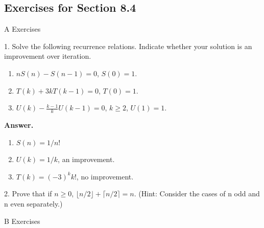 \documentclass[10pt,]{book}
\theoremstyle{plain}
\theoremstyle{definition}
\theoremstyle{definition}
\theoremstyle{definition}
\theoremstyle{definition}
\numberwithin{equation}{section}
\begin{document}
\subsection[Exercises for Section 8.4]{Exercises for Section 8.4}\label{exercises-8-4}
\hypertarget{exercisegroup-8}{}\typeout{************************************************}
\typeout{************************************************}
A Exercises%
\begin{exercisegroup}
\item[1.]\hypertarget{exercise-29}{}Solve the following recurrence relations. Indicate whether your solution is an improvement over iteration.%
\par
\leavevmode%
\begin{enumerate}[label=\alph*]
\item\hypertarget{li-94}{} \(n S(n) - S(n - 1) = 0\), { }\(S(0) = 1\).%
\item\hypertarget{li-95}{} { }\(T(k) + 3k T(k - 1) = 0\), \(T(0) = 1\).%
\item\hypertarget{li-96}{} \(U(k) -\frac{k-1}{k}U(k - 1) = 0\), \(k \geq  2\), \(U(1) = 1\).%
\end{enumerate}
%
\par\smallskip
\par\smallskip
\noindent\textbf{Answer.}\hypertarget{answer-15}{}\quad
\leavevmode%
\begin{enumerate}[label=\alph*]
\item\hypertarget{li-97}{}  \(S(n)=1/n\)!  %
\item\hypertarget{li-98}{}\(U(k)=1/k\), an improvement. %
\item\hypertarget{li-99}{}  \(T(k)=(-3)^kk\)!, no improvement.%
\end{enumerate}
%
\item[2.]\hypertarget{exercise-30}{}Prove that if \(n \geq 0\), { }\(\lfloor n/2\rfloor +\lceil n/2\rceil = n\). (Hint: Consider the cases of n odd and n even separately.)
%
\par\smallskip
\end{exercisegroup}
\par\smallskip\noindent
\hypertarget{exercisegroup-9}{}\typeout{************************************************}
\typeout{************************************************}
B Exercises%
\end{document}
